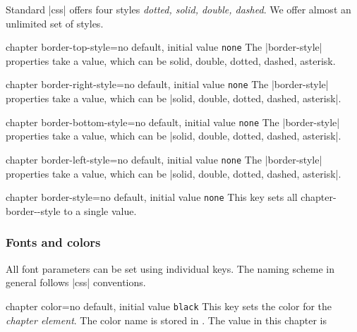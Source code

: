 \begin{decription}
Standard |css|  offers four styles \emph{dotted, solid, double, dashed}. We offer almost an unlimited set of styles.

\begin{docKey}[phd]{chapter border-top-style}{=}{no default, initial value \texttt{none}}
The |border-style| properties take a value, which can be solid, double, dotted, dashed, asterisk.
\end{docKey}

\begin{docKey}[phd]{chapter border-right-style}{=}{no default, initial value \texttt{none}}
The |border-style| properties take a value, which can be |solid, double, dotted, dashed, asterisk|.
\end{docKey}

\begin{docKey}[]{chapter border-bottom-style}{=}{no default, initial value \texttt{none}}
The |border-style| properties take a value, which can be |solid, double, dotted, dashed, asterisk|.
\end{docKey}

\begin{docKey}[]{chapter border-left-style}{=}{no default, initial value \texttt{none}}
The |border-style| properties take a value, which can be |solid, double, dotted, dashed, asterisk|.
\end{docKey}

\begin{docKey}[phd]{chapter border-style}{=}{no default, initial value \texttt{none}}
This key sets all chapter-border--style to a single value.
\end{docKey}

\subsubsection{Fonts and colors}

All font parameters can be set using individual keys. The naming scheme in general follows |css| conventions.

\begin{docKey}[phd]{chapter color}{=}{no default, initial value \texttt{black}}
This key sets the color for the \textit{chapter element}. The color name is stored in \cmd{\chaptercolor@cx}.
The value in this chapter is%
\end{docKey}


\end{decription}
